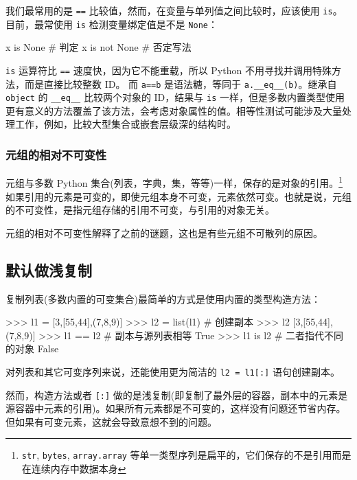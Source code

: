 我们最常用的是 \texttt{==} 比较值，然而，在变量与单列值之间比较时，应该使用 \texttt{is}。目前，最常使用 \texttt{is} 检测变量绑定值是不是 \texttt{None}：

\begin{python}
x is None       # 判定
x is not None   # 否定写法
\end{python}

\texttt{is} 运算符比 \texttt{==} 速度快，因为它不能重载，所以 Python 不用寻找并调用特殊方法，而是直接比较整数 ID。 而 \texttt{a==b} 是语法糖，等同于 \texttt{a.\_\_eq\_\_(b)}。继承自 \texttt{object} 的 \texttt{\_\_eq\_\_} 比较两个对象的 ID，结果与 \texttt{is} 一样，但是多数内置类型使用更有意义的方法覆盖了该方法，会考虑对象属性的值。相等性测试可能涉及大量处理工作，例如，比较大型集合或嵌套层级深的结构时。

\subsubsection{元组的相对不可变性}

元组与多数 Python 集合(列表，字典，集，等等)一样，保存的是对象的引用。\footnote{\texttt{str}, \texttt{bytes}, \texttt{array.array} 等单一类型序列是扁平的，它们保存的不是引用而是在连续内存中数据本身}如果引用的元素是可变的，即使元组本身不可变，元素依然可变。也就是说，元组的不可变性，是指元组存储的引用不可变，与引用的对象无关。

元组的相对不可变性解释了之前的谜题，这也是有些元组不可散列的原因。

\subsection{默认做浅复制}

复制列表(多数内置的可变集合)最简单的方式是使用内置的类型构造方法：

\begin{python}
>>> l1 = [3,[55,44],(7,8,9)]
>>> l2 = list(l1)       # 创建副本
>>> l2
[3,[55,44],(7,8,9)]
>>> l1 == l2            # 副本与源列表相等
True
>>> l1 is l2            # 二者指代不同的对象
False
\end{python}

对列表和其它可变序列来说，还能使用更为简洁的 \texttt{l2 = l1[:]} 语句创建副本。

然而，构造方法或者 \texttt{[:]} 做的是浅复制(即复制了最外层的容器，副本中的元素是源容器中元素的引用)。如果所有元素都是不可变的，这样没有问题还节省内存。但如果有可变元素，这就会导致意想不到的问题。



